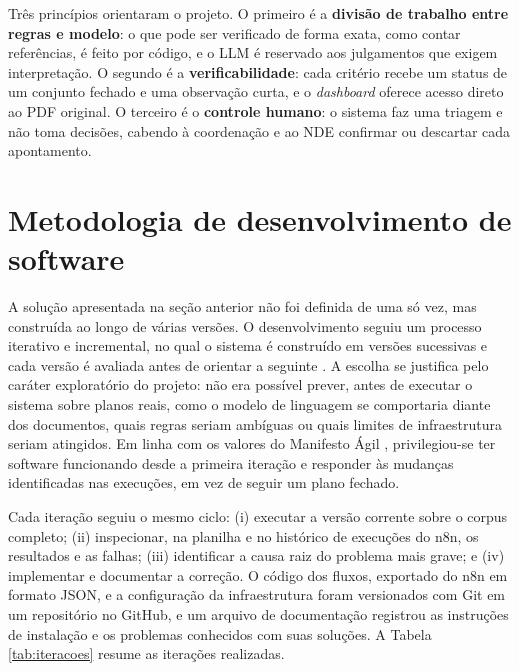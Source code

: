 Três princípios orientaram o projeto. O primeiro é a \textbf{divisão de trabalho entre regras e modelo}: o que pode ser verificado de forma exata, como contar referências, é feito por código, e o LLM é reservado aos julgamentos que exigem interpretação. O segundo é a \textbf{verificabilidade}: cada critério recebe um status de um conjunto fechado e uma observação curta, e o \textit{dashboard} oferece acesso direto ao PDF original. O terceiro é o \textbf{controle humano}: o sistema faz uma triagem e não toma decisões, cabendo à coordenação e ao NDE confirmar ou descartar cada apontamento.

\section{Metodologia de desenvolvimento de software}
\label{sec:processo}

A solução apresentada na seção anterior não foi definida de uma só vez, mas construída ao longo de várias versões. O desenvolvimento seguiu um processo iterativo e incremental, no qual o sistema é construído em versões sucessivas e cada versão é avaliada antes de orientar a seguinte \cite{Sommerville2016, Pressman2016}. A escolha se justifica pelo caráter exploratório do projeto: não era possível prever, antes de executar o sistema sobre planos reais, como o modelo de linguagem se comportaria diante dos documentos, quais regras seriam ambíguas ou quais limites de infraestrutura seriam atingidos. Em linha com os valores do Manifesto Ágil \cite{Beck2001}, privilegiou-se ter software funcionando desde a primeira iteração e responder às mudanças identificadas nas execuções, em vez de seguir um plano fechado.

Cada iteração seguiu o mesmo ciclo: (i) executar a versão corrente sobre o corpus completo; (ii) inspecionar, na planilha e no histórico de execuções do n8n, os resultados e as falhas; (iii) identificar a causa raiz do problema mais grave; e (iv) implementar e documentar a correção. O código dos fluxos, exportado do n8n em formato JSON, e a configuração da infraestrutura foram versionados com Git em um repositório no GitHub, e um arquivo de documentação registrou as instruções de instalação e os problemas conhecidos com suas soluções. A Tabela \ref{tab:iteracoes} resume as iterações realizadas.

